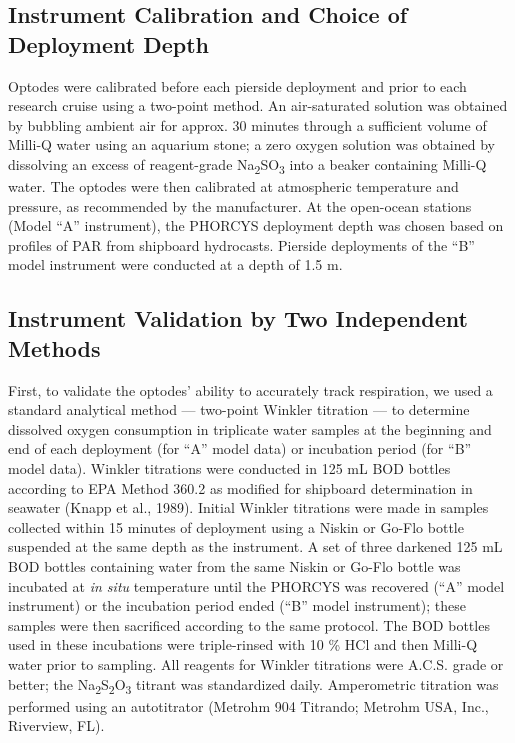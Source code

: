 \subsection{Instrument Calibration and Choice of Deployment Depth}
Optodes were calibrated before each pierside deployment and prior to each research cruise using a two-point method. An air-saturated solution was obtained by bubbling ambient air for approx. 30 minutes through a sufficient volume of Milli-Q water using an aquarium stone; a zero oxygen solution was obtained by dissolving an excess of reagent-grade Na\textsubscript{2}SO\textsubscript{3} into a beaker containing Milli-Q water. The optodes were then calibrated at atmospheric temperature and pressure, as recommended by the manufacturer. At the open-ocean stations (Model ``A'' instrument), the PHORCYS deployment depth was chosen based on profiles of PAR from shipboard hydrocasts. Pierside deployments of the ``B'' model instrument were conducted at a depth of 1.5 m.
\subsection{Instrument Validation by Two Independent Methods}
First, to validate the optodes' ability to accurately track respiration, we used a standard analytical method --- two-point Winkler titration --- to determine dissolved oxygen consumption in triplicate water samples at the beginning and end of each deployment (for ``A'' model data) or incubation period (for ``B'' model data). Winkler titrations were conducted in 125 mL BOD bottles according to EPA Method 360.2 as modified for shipboard determination in seawater (Knapp et al., 1989). Initial Winkler titrations were made in samples collected within 15 minutes of deployment using a Niskin or Go-Flo bottle suspended at the same depth as the instrument. A set of three darkened 125 mL BOD bottles containing water from the same Niskin or Go-Flo bottle was incubated at \emph{in situ} temperature until the PHORCYS was recovered (``A'' model instrument) or the incubation period ended (``B'' model instrument); these samples were then sacrificed according to the same protocol. The BOD bottles used in these incubations were triple-rinsed with 10 \% HCl and then Milli-Q water prior to sampling. All reagents for Winkler titrations were A.C.S. grade or better; the Na\textsubscript{2}S\textsubscript{2}O\textsubscript{3} titrant was standardized daily. Amperometric titration was performed using an autotitrator (Metrohm 904 Titrando; Metrohm USA, Inc., Riverview, FL).

